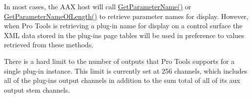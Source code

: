 \begin{DoxyRefList}
%
 In most cases, the AAX host will call \mbox{\hyperlink{a02068_a8f8ae4b4346e708ec6de612ef99e5a92}{Get\+Parameter\+Name()}} or \mbox{\hyperlink{a02068_a5d556ae1fa4617a6439ef347139d70eb}{Get\+Parameter\+Name\+Of\+Length()}} to retrieve parameter names for display. However, when Pro Tools is retrieving a plug-\/in name for display on a control surface the XML data stored in the plug-\/in\textquotesingle{}s page tables will be used in preference to values retrieved from these methods. 
\item[Member \mbox{\hyperlink{a02216_a76266e8a07ce20cdbe5721172c32a93d}{AAX\+\_\+\+IComponent\+Descriptor\+::Add\+Aux\+Output\+Stem}} (AAX\+\_\+\+CField\+Index in\+Field\+Index, int32\+\_\+t in\+Stem\+Format, const char in\+Name\+UTF8\mbox{[}\mbox{]})=0]\label{a00879__compatibility_notes000052}%
%
 There is a hard limit to the number of outputs that Pro Tools supports for a single plug-\/in instance. This limit is currently set at 256 channels, which includes all of the plug-\/in\textquotesingle{}s output channels in addition to the sum total of all of its aux output stem channels.


\end{DoxyRefList}
